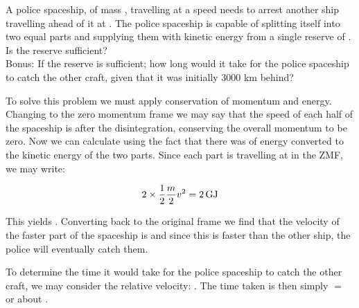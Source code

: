 
\begin{problem} 
 {A police spaceship, of mass , travelling at a speed  needs to arrest another ship travelling ahead of it at .  The police spaceship is capable of splitting itself into two equal parts and supplying them with kinetic energy from a single reserve of .  Is the reserve sufficient? \\
Bonus: If the reserve is sufficient; how long would it take for the police spaceship to catch the other craft, given that it was initially 3000 km behind?
}
{}
{To solve this problem we must apply conservation of momentum and energy. Changing to the zero momentum frame we may say that the speed of each half of the spaceship is  after the disintegration, conserving the overall momentum to be zero. Now we can calculate  using the fact that there was  of energy converted to the kinetic energy of the two parts. Since each part is travelling at  in the ZMF, we may write:

\begin{equation*}
2 \times \frac{1}{2}\frac{m}{2}v^2 = \mbox{{${2}$}{$\text{\,GJ}$}}
\end{equation*}

This yields . Converting back to the original frame we find that the velocity of the faster part of the spaceship is  and since this is faster than the other ship, the police will eventually catch them. 

To determine the time it would take for the police spaceship to catch the other craft, we may consider the relative velocity: . The time taken is then simply  $=$  or about . 


}
\end{problem}
